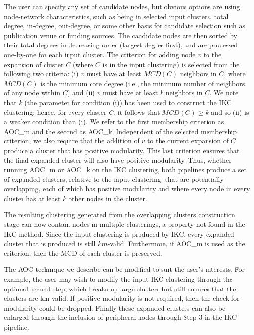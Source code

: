 \documentclass[12pt, oneside]{article}   	%
\begin{document}
The user can specify any  set of candidate nodes, but obvious options are using node-network characteristics, such as  being in selected  input clusters,  total degree, in-degree,  out-degree,  or some other basis for candidate selection such as publication venue or funding sources. The candidate nodes are then sorted by their total degrees in decreasing order (largest degree first), and are processed one-by-one for each input cluster. The criterion for adding node $v$ to the expansion of cluster $C$ (where $C$ is in the input clustering) is selected from the following two criteria:
 (i) $v$ must have at least $MCD(C)$ neighbors in  $C$, 
where $MCD(C)$ is the minimum core degree (i.e., the minimum number of neighbors of any node within $C$)  and
(ii) $v$ must have at least $k$ neighbors in  $C$. We note that $k$ (the parameter for condition (i)) has been used to construct the IKC clustering; hence, for every cluster $C$,  it follows that $MCD(C) \geq k$ and so (ii) is a weaker condition than (i). We refer to the first membership criterion as AOC\_m and the second as AOC\_k.
Independent of the selected membership criterion, we also require that the addition of $v$ to the current expansion of $C$ produce a cluster that has positive modularity.
This last criterion ensures that the final expanded cluster will also have positive modularity.
	Thus, whether running   AOC\_m or AOC\_k on the IKC clustering, both pipelines produce a set of expanded clusters, relative to the input clustering, that are potentially overlapping,  each of which has positive modularity and where every node in every cluster has at least $k$
	 other nodes in the cluster.  
	 	
The resulting clustering generated from the overlapping clusters construction stage can now contain nodes in multiple clusterings, a property not found in the IKC method. 
Since the input clustering is produced by IKC, every  expanded cluster that is produced is still $km$-valid. Furthermore, if AOC\_m is used as the criterion, then the MCD of each cluster is preserved.

The AOC technique we describe can be modified to suit the user's interests. For example,   the user may wish to modify the input IKC clustering through the optional second step, which breaks  up large clusters but still ensures that the clusters are km-valid.
If positive modularity is not required, then the check for modularity could be dropped.  Finally these expanded clusters can also be enlarged through the inclusion of peripheral nodes through Step 3 in the IKC pipeline.
\end{document}
